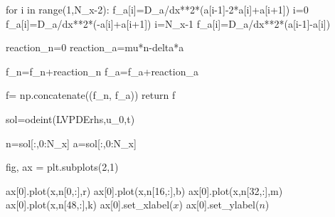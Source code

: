 \documentclass[
  letterpaper,
  DIV=11,
  numbers=noendperiod]{scrreprt}
\newenvironment{Shaded}{\begin{snugshade}}{\end{snugshade}}
\newcommand{\BuiltInTok}[1]{\textcolor[rgb]{0.00,0.23,0.31}{#1}}
\newcommand{\ControlFlowTok}[1]{\textcolor[rgb]{0.00,0.23,0.31}{#1}}
\newcommand{\DecValTok}[1]{\textcolor[rgb]{0.68,0.00,0.00}{#1}}
\newcommand{\KeywordTok}[1]{\textcolor[rgb]{0.00,0.23,0.31}{#1}}
\newcommand{\NormalTok}[1]{\textcolor[rgb]{0.00,0.23,0.31}{#1}}
\newcommand{\OperatorTok}[1]{\textcolor[rgb]{0.37,0.37,0.37}{#1}}
\newcommand{\StringTok}[1]{\textcolor[rgb]{0.13,0.47,0.30}{#1}}
\theoremstyle{plain}
\theoremstyle{definition}
\theoremstyle{plain}
\theoremstyle{remark}
\begin{document}
\begin{Shaded}
\begin{Highlighting}[]
    \ControlFlowTok{for}\NormalTok{ i }\KeywordTok{in} \BuiltInTok{range}\NormalTok{(}\DecValTok{1}\NormalTok{,N\_x}\OperatorTok{{-}}\DecValTok{2}\NormalTok{):}
\NormalTok{      f\_a[i]}\OperatorTok{=}\NormalTok{D\_a}\OperatorTok{/}\NormalTok{dx}\OperatorTok{**}\DecValTok{2}\OperatorTok{*}\NormalTok{(a[i}\OperatorTok{{-}}\DecValTok{1}\NormalTok{]}\OperatorTok{{-}}\DecValTok{2}\OperatorTok{*}\NormalTok{a[i]}\OperatorTok{+}\NormalTok{a[i}\OperatorTok{+}\DecValTok{1}\NormalTok{]) }
\NormalTok{    i}\OperatorTok{=}\DecValTok{0}
\NormalTok{    f\_a[i]}\OperatorTok{=}\NormalTok{D\_a}\OperatorTok{/}\NormalTok{dx}\OperatorTok{**}\DecValTok{2}\OperatorTok{*}\NormalTok{(}\OperatorTok{{-}}\NormalTok{a[i]}\OperatorTok{+}\NormalTok{a[i}\OperatorTok{+}\DecValTok{1}\NormalTok{]) }
\NormalTok{    i}\OperatorTok{=}\NormalTok{N\_x}\OperatorTok{{-}}\DecValTok{1}
\NormalTok{    f\_a[i]}\OperatorTok{=}\NormalTok{D\_a}\OperatorTok{/}\NormalTok{dx}\OperatorTok{**}\DecValTok{2}\OperatorTok{*}\NormalTok{(a[i}\OperatorTok{{-}}\DecValTok{1}\NormalTok{]}\OperatorTok{{-}}\NormalTok{a[i])}

\NormalTok{    reaction\_n}\OperatorTok{=}\DecValTok{0}
\NormalTok{    reaction\_a}\OperatorTok{=}\NormalTok{mu}\OperatorTok{*}\NormalTok{n}\OperatorTok{{-}}\NormalTok{delta}\OperatorTok{*}\NormalTok{a}

\NormalTok{    f\_n}\OperatorTok{=}\NormalTok{f\_n}\OperatorTok{+}\NormalTok{reaction\_n}
\NormalTok{    f\_a}\OperatorTok{=}\NormalTok{f\_a}\OperatorTok{+}\NormalTok{reaction\_a}

\NormalTok{    f}\OperatorTok{=}\NormalTok{ np.concatenate((f\_n, f\_a)) }
    \ControlFlowTok{return}\NormalTok{ f  }

\NormalTok{sol}\OperatorTok{=}\NormalTok{odeint(LVPDErhs,u\_0,t)}

\NormalTok{n}\OperatorTok{=}\NormalTok{sol[:,}\DecValTok{0}\NormalTok{:N\_x]}
\NormalTok{a}\OperatorTok{=}\NormalTok{sol[:,}\DecValTok{0}\NormalTok{:N\_x]}

\NormalTok{fig, ax }\OperatorTok{=}\NormalTok{ plt.subplots(}\DecValTok{2}\NormalTok{,}\DecValTok{1}\NormalTok{)}

\NormalTok{ax[}\DecValTok{0}\NormalTok{].plot(x,n[}\DecValTok{0}\NormalTok{,:],}\StringTok{\textquotesingle{}r\textquotesingle{}}\NormalTok{)}
\NormalTok{ax[}\DecValTok{0}\NormalTok{].plot(x,n[}\DecValTok{16}\NormalTok{,:],}\StringTok{\textquotesingle{}b\textquotesingle{}}\NormalTok{)}
\NormalTok{ax[}\DecValTok{0}\NormalTok{].plot(x,n[}\DecValTok{32}\NormalTok{,:],}\StringTok{\textquotesingle{}m\textquotesingle{}}\NormalTok{)}
\NormalTok{ax[}\DecValTok{0}\NormalTok{].plot(x,n[}\DecValTok{48}\NormalTok{,:],}\StringTok{\textquotesingle{}k\textquotesingle{}}\NormalTok{)}
\NormalTok{ax[}\DecValTok{0}\NormalTok{].set\_xlabel(}\StringTok{\textquotesingle{}$x$\textquotesingle{}}\NormalTok{)}
\NormalTok{ax[}\DecValTok{0}\NormalTok{].set\_ylabel(}\StringTok{\textquotesingle{}$n$\textquotesingle{}}\NormalTok{)}


\end{Highlighting}
\end{Shaded}
\end{document}
